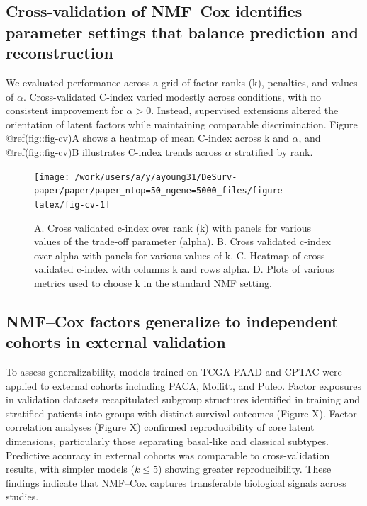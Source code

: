 \documentclass[9pt,twocolumn,twoside,]{pnas-new}
\begin{document}
\subsection{Cross-validation of NMF--Cox identifies parameter settings
that balance prediction and
reconstruction}\label{cross-validation-of-nmfcox-identifies-parameter-settings-that-balance-prediction-and-reconstruction}

We evaluated performance across a grid of factor ranks (k), penalties,
and values of \(\alpha\). Cross-validated C-index varied modestly across
conditions, with no consistent improvement for \(\alpha>0\). Instead,
supervised extensions altered the orientation of latent factors while
maintaining comparable discrimination. Figure @ref(fig::fig-cv)A shows a
heatmap of mean C-index across k and \(\alpha\), and @ref(fig::fig-cv)B
illustrates C-index trends across \(\alpha\) stratified by rank.

\begin{figure}[t]

{\centering \texttt{[image: /work/users/a/y/ayoung31/DeSurv-paper/paper/paper\_ntop=50\_ngene=5000\_files/figure-latex/fig-cv-1]} 

}

\caption{A. Cross validated c-index over rank (k) with panels for various values of the trade-off parameter (alpha). B. Cross validated c-index over alpha with panels for various values of k. C. Heatmap of cross-validated c-index with columns k and rows alpha. D. Plots of various metrics used to choose k in the standard NMF setting.}\label{fig:fig-cv}
\end{figure}

\subsection{NMF--Cox factors generalize to independent cohorts in
external
validation}\label{nmfcox-factors-generalize-to-independent-cohorts-in-external-validation}

To assess generalizability, models trained on TCGA-PAAD and CPTAC were
applied to external cohorts including PACA, Moffitt, and Puleo. Factor
exposures in validation datasets recapitulated subgroup structures
identified in training and stratified patients into groups with distinct
survival outcomes (Figure X). Factor correlation analyses (Figure X)
confirmed reproducibility of core latent dimensions, particularly those
separating basal-like and classical subtypes. Predictive accuracy in
external cohorts was comparable to cross-validation results, with
simpler models (\(k\leq 5\)) showing greater reproducibility. These
findings indicate that NMF--Cox captures transferable biological signals
across studies.
\end{document}
